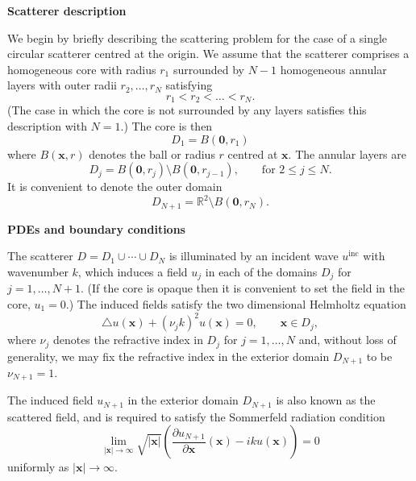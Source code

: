 \documentclass[11pt,letterpaper]{article}
\newcommand{\x}{\boldsymbol{x}}
\newcommand{\zero}{\boldsymbol{0}}
\newcommand{\bbR}{\mathbb{R}}
\newcommand{\inc}{\mathrm{inc}}
\newcommand{\ri}{\nu}
\newcommand{\techheading}[1]{%
    \par\vspace{-0.3\parskip}\noindent\hspace{-1cm}\textbf{#1}%
    \par\vspace{-0.5\parskip}\noindent\nopagebreak\ignorespaces}
\begin{document}
\techheading{Scatterer description}
We begin by briefly describing the scattering problem for the case of a
single circular scatterer centred at the origin.
We assume that the scatterer comprises a homogeneous core
with radius $r_1$ surrounded by $N-1$ homogeneous annular layers
with outer radii $r_2,\dots,r_N$ satisfying
\begin{displaymath}
r_1 < r_2 < \dots < r_N.
\end{displaymath}
(The case in which the core is not surrounded by
any layers satisfies this description with $N=1$.)
The core is then
\begin{displaymath}
D_1 = B(\zero,r_1)
\end{displaymath}
where $B(\x,r)$ denotes the ball or radius $r$ centred at $\x$.
The annular layers are 
\begin{displaymath}
  D_j = B(\zero,r_j) \setminus B(\zero,r_{j-1}),
  \qquad \mbox{for $2 \leq j \leq N$}.
\end{displaymath}
It is convenient to denote the outer domain
\begin{displaymath}
D_{N+1} = \bbR^2 \setminus B(\zero,r_N).
\end{displaymath}

\techheading{PDEs and boundary conditions}
The scatterer
$D = D_1 \cup \cdots \cup D_N$
is illuminated by an incident wave $u^\inc$ with wavenumber $k$,
which induces a
field $u_j$ in each of the domains $D_j$ for $j=1,\dots,N+1$.
(If the core is opaque then it is convenient to set the field in the core,
$u_1 = 0$.)
The induced fields
satisfy the two dimensional Helmholtz equation
\begin{equation}
  \label{eq:helmholtz}
  \triangle u(\x) + (\ri_j k)^2 u(\x) = 0, \qquad \x \in D_j,
\end{equation}
where $\ri_j$ denotes the refractive index in $D_j$
for $j=1,\dots,N$ and,
without loss of generality, we may fix the refractive
index in the exterior domain $D_{N+1}$ to be $\ri_{N+1}=1$.

The induced field $u_{N+1}$ in the exterior domain $D_{N+1}$ is also 
known as the scattered field, and is required to satisfy
the Sommerfeld radiation condition~\cite[Equation~(3.85)]{colton:inverse}
\begin{equation}
  \label{eq:radiation-condition}
  \lim_{|\x|\to \infty} \sqrt{|\x|} \left( \frac{\partial u_{N+1}}{\partial \x}(\x)
  - i k u(\x) \right) = 0
\end{equation}
uniformly as $|\x| \to \infty$.
\end{document}
